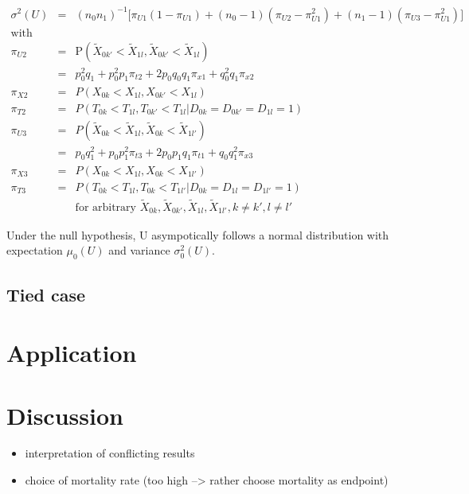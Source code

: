 \documentclass[bimj,fleqn]{w-art}\usepackage[]{graphicx}\usepackage[]{color}
\theoremstyle{plain}
\theoremstyle{definition}
\begin{document}
  \begin{eqnarray*}
  \sigma^2(U) & = & (n_0 n_1)^{-1} \big[ \pi_{U1} (1 - \pi_{U1}) +
                                    (n_0 - 1) (\pi_{U2} - \pi_{U1}^2) +
                                    (n_1 - 1) (\pi_{U3} - \pi_{U1}^2) \big] \\
  \mbox{with} &   & \\
  \pi_{U2} & = & \text{P}(\widetilde{X}_{0k'} < \widetilde{X}_{1l}, \widetilde{X}_{0k'} < \widetilde{X}_{1l}) \\
           & = & p_0^2 q_1 + p_0^2 p_1 \pi_{t2} + 2 p_0 q_0 q_1 \pi_{x1} + q_0^2 q_1 \pi_{x2} \\
  \pi_{X2} & = & P(X_{0k} < X_{1l}, X_{0k'} < X_{1l}) \\
  \pi_{T2} & = & P(T_{0k} < T_{1l}, T_{0k'} < T_{1l} | D_{0k} = D_{0k'} = D_{1l} = 1) \\
  \pi_{U3} & = & P(\widetilde{X}_{0k} < \widetilde{X}_{1l}, \widetilde{X}_{0k} < \widetilde{X}_{1l'}) \\
           & = & p_0 q_1^2 + p_0 p_1^2 \pi_{t3} + 2 p_0 p_1 q_1 \pi_{t1} + q_0 q_1^2 \pi_{x3} \\
  \pi_{X3} & = & P(X_{0k} < X_{1l}, X_{0k} < X_{1l'}) \\
  \pi_{T3} & = & P(T_{0k} < T_{1l}, T_{0k} < T_{1l'} | D_{0k} = D_{1l} = D_{1l'} =1)\\
           &   & \mbox{for arbitrary } \widetilde{X}_{0k}, \widetilde{X}_{0k'}, \widetilde{X}_{1l},
                                      \widetilde{X}_{1l'}, k \ne k', l \ne l'
  \end{eqnarray*}


  Under the null hypothesis, U asympotically follows a normal distribution with
  expectation $\mu_0(U)$ and variance $\sigma^2_0(U)$.

  \subsection{Tied case}
  \label{sec:PowerTied}


  \section{Application}
  \label{sec:Application}

  \section{Discussion}
  \label{sec:Discussion}
  \begin{itemize}
  \item interpretation of conflicting results
  \item choice of mortality rate (too high --> rather choose mortality as endpoint)
\end{itemize}
\end{document}
